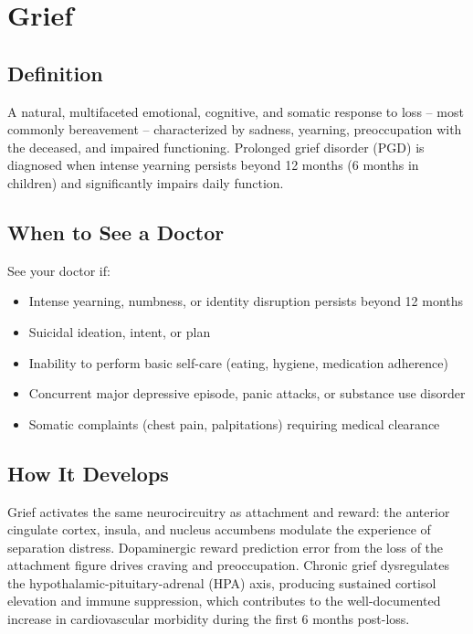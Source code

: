 \chapter{Grief}

\section*{Definition}
A natural, multifaceted emotional, cognitive, and somatic response to loss -- most commonly bereavement -- characterized by sadness, yearning, preoccupation with the deceased, and impaired functioning. Prolonged grief disorder (PGD) is diagnosed when intense yearning persists beyond 12 months (6 months in children) and significantly impairs daily function.

\section*{When to See a Doctor}
See your doctor if:
\begin{itemize}
  \item Intense yearning, numbness, or identity disruption persists beyond 12 months
  \item Suicidal ideation, intent, or plan
  \item Inability to perform basic self-care (eating, hygiene, medication adherence)
  \item Concurrent major depressive episode, panic attacks, or substance use disorder
  \item Somatic complaints (chest pain, palpitations) requiring medical clearance
\end{itemize}

\section*{How It Develops}
Grief activates the same neurocircuitry as attachment and reward: the anterior cingulate cortex, insula, and nucleus accumbens modulate the experience of separation distress. Dopaminergic reward prediction error from the loss of the attachment figure drives craving and preoccupation. Chronic grief dysregulates the hypothalamic-pituitary-adrenal (HPA) axis, producing sustained cortisol elevation and immune suppression, which contributes to the well-documented increase in cardiovascular morbidity during the first 6 months post-loss.

